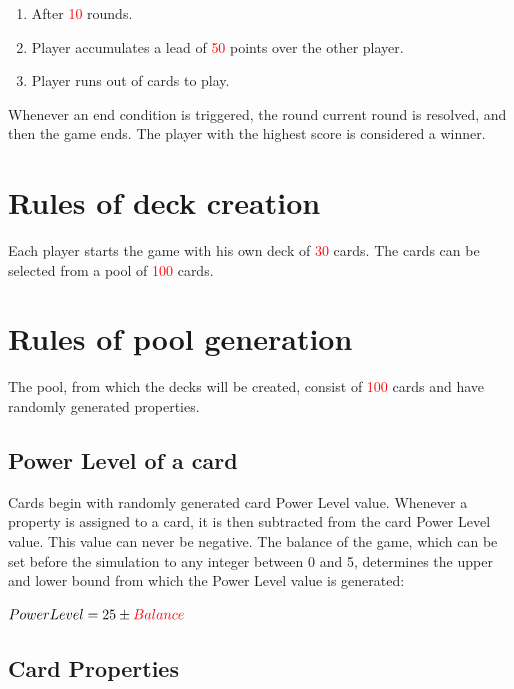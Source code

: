 \documentclass{article}
\begin{document}
    \begin{enumerate}
        \item After \textcolor{red}{10} rounds.
        \item Player accumulates a lead of \textcolor{red}{50} points over the other player.
        \item Player runs out of cards to play.
    \end{enumerate}
    
    \begin{flushleft}
        Whenever an end condition is triggered, the round current round is resolved, and then the game ends. The player with the highest score is considered a winner.
    \end{flushleft}

\section{Rules of deck creation}
    
    Each player starts the game with his own deck of \textcolor{red}{30} cards. 
    The cards can be selected from a pool of \textcolor{red}{100} cards.

\section{Rules of pool generation}
    
    The pool, from which the decks will be created, consist of \textcolor{red}{100} cards and have randomly generated properties.

\subsection{Power Level of a card}
    
    Cards begin with randomly generated card Power Level value.  Whenever a property 
    is assigned to a card, it is then subtracted from the card Power Level value. 
    This value can never be negative. The balance of the game, which can be set before the simulation to any integer between 0 and 5, determines the upper and lower bound from which the Power Level value is generated:
    
    \begin{center}
        $Power Level = 25\pm \textcolor{red}{Balance}$ \\
    \end{center}

\subsection{Card Properties}
\end{document}
